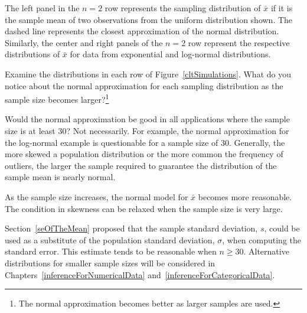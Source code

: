 The left panel in the $n=2$ row represents the sampling distribution of $\bar{x}$ if it is the sample mean of two observations from the uniform distribution shown. The dashed line represents the closest approximation of the normal distribution. Similarly, the center and right panels of the $n=2$ row represent the respective distributions of $\bar{x}$ for data from exponential and log-normal distributions.

\begin{exercise}
Examine the distributions in each row of Figure~\ref{cltSimulations}. What do you notice about the normal approximation for each sampling distribution as the sample size becomes larger?\footnote{The normal approximation becomes better as larger samples are used.}
\end{exercise}

\begin{example}{Would the normal approximation be good in all applications where the sample size is at least 30?}
Not necessarily. For example, the normal approximation for the log-normal example is questionable for a sample size of 30. Generally, the more skewed a population distribution or the more common the frequency of outliers, the larger the sample required to guarantee the distribution of the sample mean is nearly normal.
\end{example}

\begin{tipBox}{
As the sample size increases, the normal model for $\bar{x}$ becomes more reasonable. The condition in skewness can be relaxed when the sample size is very large.}
\end{tipBox}

Section~\ref{seOfTheMean} proposed that the sample standard deviation, $s$, could be used as a substitute of the population standard deviation, $\sigma$, when computing the standard error. This estimate tends to be reasonable when $n\geq30$. Alternative distributions for smaller sample sizes will be considered in Chapters~\ref{inferenceForNumericalData} and~\ref{inferenceForCategoricalData}.



